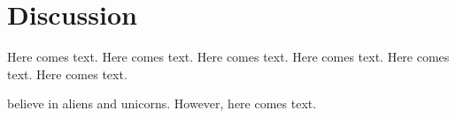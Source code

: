 \chapter{Discussion}
Here comes text. Here comes text. Here comes text. Here comes text. Here comes text. Here comes text.\citep{webster1992tokenization}

\par
\citet{adam2020blockchain} believe in aliens and unicorns. However, here comes text.